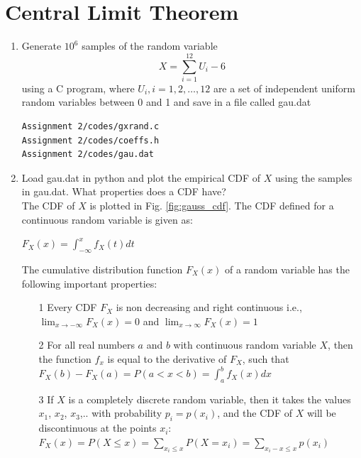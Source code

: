 \documentclass[journal,12pt,twocolumn]{IEEEtran}
\renewcommand\thesection{\arabic{section}}
\begin{document}
\section{Central Limit Theorem}
%
\begin{enumerate}[label=\thesection.\arabic*
,ref=\thesection.\theenumi]

%
\item
Generate $10^6$ samples of the random variable
%
\begin{equation}
X = \sum_{i=1}^{12}U_i -6
\end{equation}
%
using a C program, where $U_i, i = 1,2,\dots, 12$ are  a set of independent uniform random variables between 0 and 1
and save in a file called gau.dat\\
\solution 
\begin{lstlisting}
Assignment 2/codes/gxrand.c
Assignment 2/codes/coeffs.h
Assignment 2/codes/gau.dat
\end{lstlisting}
%
\item
Load gau.dat in python and plot the empirical CDF of $X$ using the samples in gau.dat. What properties does a CDF have?
\\
\solution The CDF of $X$ is plotted in Fig. \ref{fig:gauss_cdf}. The CDF defined for a continuous random variable is given as:\\
\begin{center}
$F_{X}(x)=\int_{-\infty}^{x}f_{X}(t)dt$
\end{center}
The cumulative distribution function $F_{X}(x)$ of a random variable has the following important properties:
\begin{itemize}
\item[1] Every CDF $F_{X}$ is non decreasing and right continuous i.e.,
$\lim_{x\to-\infty} F_{X}(x)=0$ and $\lim_{x\to\infty} F_{X}(x)=1$
\item[2] For all real numbers $a$ and $b$ with continuous random variable $X$, then the function $f_{x}$ is equal to the derivative of $F_{X}$, such that \\
$F_{X}(b)-F_{X}(a)=P(a<x<b)=\int_{a}^{b}f_{X}(x)dx$
\item[3] If $X$ is a completely discrete random variable, then it takes the values $x_1$, $x_2$, $x_3$,..  with probability $p_i = p(x_i)$, and the CDF of $X$ will be discontinuous at the points $x_i$:\\
$F_{X}(x)=P(X\leq x)=\sum_{x_i\leq x}P(X=x_i)=\sum_{x_i-x\leq x}p(x_i)$
\\
\end{itemize}

\end{enumerate}
\end{document}
